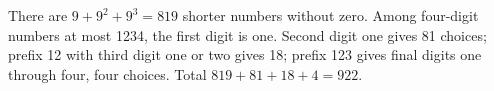 There are $9+9^2+9^3=819$ shorter numbers without zero. Among four-digit numbers at most 1234, the first digit is one. Second digit one gives 81 choices; prefix 12 with third digit one or two gives 18; prefix 123 gives final digits one through four, four choices. Total $819+81+18+4=\boxed{922}$.
